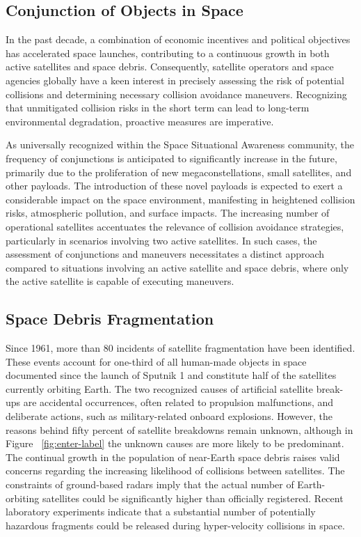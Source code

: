 \documentclass[11pt]{article} %
\begin{document}
\subsection{Conjunction of Objects in Space}

In the past decade, a combination of economic incentives and political objectives has accelerated space launches, contributing to a continuous growth in both active satellites and space debris. Consequently, satellite operators and space agencies globally have a keen interest in precisely assessing the risk of potential collisions and determining necessary collision avoidance maneuvers. Recognizing that unmitigated collision risks in the short term can lead to long-term environmental degradation, proactive measures are imperative.

As universally recognized within the Space Situational Awareness community, the frequency of conjunctions is anticipated to significantly increase in the future, primarily due to the proliferation of new megaconstellations, small satellites, and other payloads. The introduction of these novel payloads is expected to exert a considerable impact on the space environment, manifesting in heightened collision risks, atmospheric pollution, and surface impacts. The increasing number of operational satellites accentuates the relevance of collision avoidance strategies, particularly in scenarios involving two active satellites. In such cases, the assessment of conjunctions and maneuvers necessitates a distinct approach compared to situations involving an active satellite and space debris, where only the active satellite is capable of executing maneuvers.~\cite{oltrogge_collision_2016}

\subsection{Space Debris Fragmentation}

Since 1961, more than 80 incidents of satellite fragmentation have been identified. These events account for one-third of all human-made objects in space documented since the launch of Sputnik 1 and constitute half of the satellites currently orbiting Earth. The two recognized causes of artificial satellite break-ups are accidental occurrences, often related to propulsion malfunctions, and deliberate actions, such as military-related onboard explosions. However, the reasons behind fifty percent of satellite breakdowns remain unknown, although in Figure ~\ref{fig:enter-label} the unknown causes are more likely to be predominant. The continual growth in the population of near-Earth space debris raises valid concerns regarding the increasing likelihood of collisions between satellites. The constraints of ground-based radars imply that the actual number of Earth-orbiting satellites could be significantly higher than officially registered. Recent laboratory experiments indicate that a substantial number of potentially hazardous fragments could be released during hyper-velocity collisions in space.~\cite{johnson_history_1985}
\end{document}
